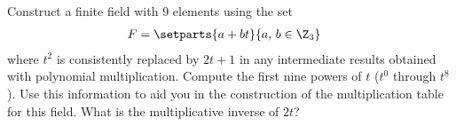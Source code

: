Construct a finite field with 9 elements using the set
%
\begin{align*}
F&=\setparts{a+bt}{a,\,b\in\Z_3}
\end{align*}
%
where $t^2$ is consistently replaced by $2t+1$ in any intermediate results obtained with polynomial multiplication.  Compute the first nine powers of $t$ ($t^0$ through $t^8$).  Use this information to aid you in the construction of the multiplication table for this field.  What is the multiplicative inverse of $2t$?